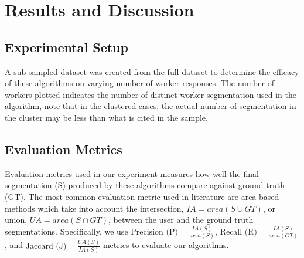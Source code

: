 \section{Results and Discussion\label{sec:results}}

  \subsection{Experimental Setup}
    \par  A sub-sampled dataset was created from the full dataset to determine the efficacy of these algorithms on varying number of worker responses.
     The number of workers plotted indicates the number of distinct worker segmentation used in the algorithm, note that in the clustered cases, the actual number of segmentation in the cluster may be less than what is cited in the sample. 
  \subsection{Evaluation Metrics}
   \par Evaluation metrics used in our experiment measures how well the final segmentation (S) produced by these algorithms compare against ground truth (GT). The most common evaluation metric used in literature are area-based methods which take into account the intersection, $IA=area(S\cup GT)$, or union, $UA=area(S\cap GT)$, between the user and the ground truth segmentations. Specifically, we use
    $\text{Precision (P)} = \frac{IA(S)}{area(S)}$, 
    $\text{Recall (R)} = \frac{IA(S)}{area(GT)}$, and 
    $\text{Jaccard (J)} = \frac{UA(S)}{IA(S)}$
    metrics to evaluate our algorithms.

